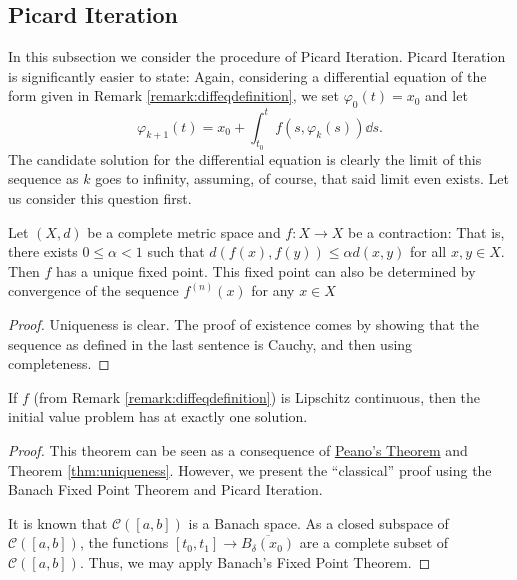 \documentclass[prb,12pt]{revtex4-2}
\theoremstyle{definition}
\theoremstyle{definition}
\theoremstyle{definition}
\begin{document}
	\subsection{Picard Iteration}
	In this subsection we consider the procedure of Picard Iteration. Picard Iteration is significantly easier to state: Again, considering a differential equation of the form given in Remark \ref{remark:diffeqdefinition}, we set $\varphi_0(t)=x_0$ and let
	\[\varphi_{k+1}(t) = x_0+\int_{t_0}^{t} f(s, \varphi_k(s))\dd{s}.\]
	The candidate solution for the differential equation is clearly the limit of this sequence as $k$ goes to infinity, assuming, of course, that said limit even exists. Let us consider this question first.
	\begin{Theorem}
		Let $(X, d)$ be a complete metric space and $f:X\to X$ be a contraction: That is, there exists $0\le\alpha<1$ such that $d(f(x), f(y))\le \alpha d(x,y)$ for all $x,y\in X$. Then $f$ has a unique fixed point. This fixed point can also be determined by convergence of the sequence $f^{(n)}(x)$ for any $x\in X$
	\end{Theorem}
	\begin{proof}
		Uniqueness is clear. The proof of existence comes by showing that the sequence as defined in the last sentence is Cauchy, and then using completeness.
	\end{proof}
	\begin{Theorem}
		If $f$ (from Remark \ref{remark:diffeqdefinition}) is Lipschitz continuous, then the initial value problem has at exactly one solution.
	\end{Theorem}
\begin{proof}
	This theorem can be seen as a consequence of \hyperref[thm:peano]{Peano's Theorem} and Theorem \ref{thm:uniqueness}. However, we present the ``classical'' proof using the Banach Fixed Point Theorem and Picard Iteration.
	
	It is known that $\mathcal{C}([a,b])$ is a Banach space. As a closed subspace of $\mathcal{C}([a,b])$, the functions $[t_0,t_1]\to \overline{B_\delta(x_0)}$ are a complete subset of $\mathcal{C}([a,b])$. Thus, we may apply Banach's Fixed Point Theorem.
\end{proof}
\end{document}
